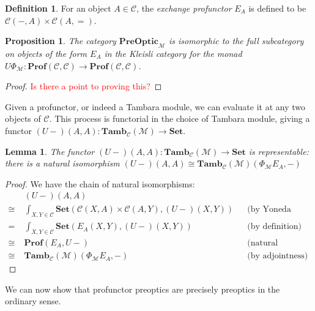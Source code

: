 \documentclass[11pt,a4paper]{article}
\theoremstyle{plain}
\newtheorem{proposition}[theorem]{Proposition}
\newtheorem{lemma}[theorem]{Lemma}
\theoremstyle{definition}
\newtheorem{definition}[theorem]{Definition}
\newcommand{\C}{\mathscr{C}}
\newcommand{\M}{\mathscr{M}}
\newcommand{\Pastro}{\Phi}
\newcommand{\Set}{\mathbf{Set}}
\newcommand{\Prof}{\mathbf{Prof}}
\newcommand{\PreOptic}{\mathbf{PreOptic}}
\newcommand{\Tamb}{\mathbf{Tamb}}
\newcommand{\todo}[1]{\textcolor{red}{\small #1}}
\begin{document}
\begin{definition}
For an object $A \in \C$, the \emph{exchange profunctor} $E_A$ is defined to be $\C(-, A) \times \C(A, {=})$.
\end{definition}

\begin{proposition}
The category $\PreOptic_\M$ is isomorphic to the full subcategory on objects of the form $E_A$ in the Kleisli category for the monad $U \Pastro_\M : \Prof(\C, \C) \to \Prof(\C, \C)$.
\end{proposition}
\begin{proof}
\todo{Is there a point to proving this?}
\end{proof}

Given a profunctor, or indeed a Tambara module, we can evaluate it at any two objects of $\C$. This process is functorial in the choice of Tambara module, giving a functor $(U-)(A,A) : \Tamb_\C(\M) \to \Set$.

\begin{lemma}
\label{lemma-rep}
The functor $(U-)(A,A) : \Tamb_\C(\M) \to \Set$ is representable: there is a natural isomorphism
$(U-)(A,A) \cong \Tamb_\C(\M)(\Pastro_\M E_A, -)$
\end{lemma}
\begin{proof}
We have the chain of natural isomorphisms:
\begin{align*}
&(U-)(A,A) \\
\cong \;&\int_{X,Y \in \C} \Set(\C(X,A) \times \C(A,Y), (U-)(X,Y)) && \text{(by Yoneda (un)reduction twice)} \\
=\;&\int_{X,Y \in \C} \Set(E_A(X,Y), (U-)(X,Y)) && \text{(by definition)}\\
\cong \;&\Prof(E_A, U-) && \text{(natural transformations as ends)} \\
\cong \;&\Tamb_\C(\M)(\Pastro_\M E_A, -) && \text{(by adjointness)} 
\end{align*}
\end{proof}

We can now show that profunctor preoptics are precisely preoptics in the ordinary sense.
\end{document}
